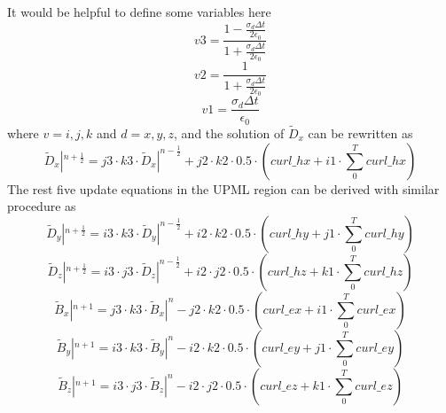 It would be helpful to define some variables here
\begin{equation}\label{eq:v3}
  v3 = \frac{\displaystyle 1 - \frac{\sigma_d\Delta t}{2\epsilon_0}}{\displaystyle 1 + \frac{\sigma_d\Delta t}{2\epsilon_0}}
\end{equation}
\begin{equation}\label{eq:v2}
  v2 = \frac{1}{\displaystyle 1 + \frac{\sigma_d\Delta t}{2\epsilon_0}}
\end{equation}
\begin{equation}\label{eq:v1}
  v1 = \frac{\sigma_d \Delta t}{\epsilon_0} 
\end{equation}
where $v = i,j,k$ and $d = x,y,z$, and the solution of $\widetilde{D}_x$ can be rewritten as 
\begin{equation}\label{eq:pmldx}
  \widetilde{D}_x|^{n+\frac{1}{2}} = j3 \cdot k3 \cdot \widetilde{D}_x|^{n-\frac{1}{2}} + j2 \cdot k2 \cdot 0.5 \cdot \left( curl\_hx + i1 \cdot \sum_0^T curl\_hx \right)
\end{equation}
The rest five update equations in the UPML region can be derived with similar procedure as
\begin{equation}\label{eq:pmldy}
  \widetilde{D}_y|^{n+\frac{1}{2}} = i3 \cdot k3 \cdot \widetilde{D}_y|^{n-\frac{1}{2}} + i2 \cdot k2 \cdot 0.5 \cdot \left( curl\_hy + j1 \cdot \sum_0^T curl\_hy \right)
\end{equation}
\begin{equation}\label{eq:pmldz}
  \widetilde{D}_z|^{n+\frac{1}{2}} = i3 \cdot j3 \cdot \widetilde{D}_z|^{n-\frac{1}{2}} + i2 \cdot j2 \cdot 0.5 \cdot \left( curl\_hz + k1 \cdot \sum_0^T curl\_hz \right)
\end{equation}
\begin{equation}
  \widetilde{B}_x|^{n+1} = j3 \cdot k3 \cdot \widetilde{B}_x|^{n} - j2 \cdot k2 \cdot 0.5 \cdot \left( curl\_ex + i1 \cdot \sum_0^T curl\_ex \right)
\end{equation}
\begin{equation}
  \widetilde{B}_y|^{n+1} = i3 \cdot k3 \cdot \widetilde{B}_y|^{n} - i2 \cdot k2 \cdot 0.5 \cdot \left( curl\_ey + j1 \cdot \sum_0^T curl\_ey \right)
\end{equation}
\begin{equation}
  \widetilde{B}_z|^{n+1} = i3 \cdot j3 \cdot \widetilde{B}_z|^{n} - i2 \cdot j2 \cdot 0.5 \cdot \left( curl\_ez + k1 \cdot \sum_0^T curl\_ez \right)
\end{equation}





